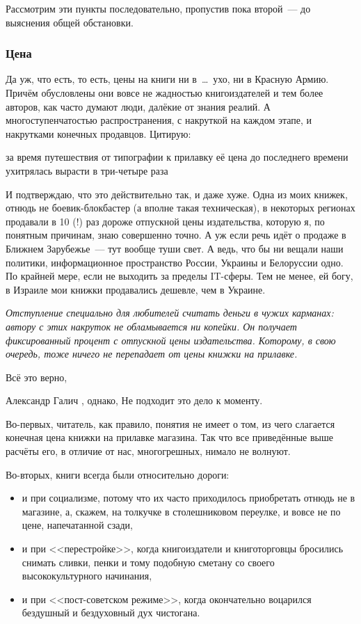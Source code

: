 Рассмотрим эти пункты последовательно, пропустив пока второй~--- до выяснения общей обстановки.
\subsubsection{Цена}
Да уж, что есть, то есть, цены на книги ни в~\dots~ухо, ни в Красную Армию. Причём обусловлены они вовсе не жадностью книгоиздателей и тем более авторов, как часто думают люди, далёкие от знания реалий. А многоступенчатостью распространения, с накруткой на каждом этапе, и накрутками конечных продавцов. Цитирую:


\begin{shadequote}{}
за время путешествия от типографии к прилавку её цена до последнего времени ухитрялась вырасти в три-четыре раза
\end{shadequote}

И подтверждаю, что это действительно так, и даже хуже. Одна из моих книжек, отнюдь не боевик-блокбастер (а вполне такая техническая), в некоторых регионах продавали в 10 (!) раз дороже отпускной цены издательства, которую я, по понятным причинам, знаю совершенно точно. А уж если речь идёт о продаже в Ближнем Зарубежье~--- тут вообще туши свет. А ведь, что бы ни вещали наши политики, информационное пространство России, Украины и Белоруссии одно. По крайней мере, если не выходить за пределы IT-сферы. Тем не менее, ей богу, в Израиле мои книжки продавались дешевле, чем в Украине.


\textit{Отступление специально для любителей считать деньги в чужих карманах: автору с этих накруток не обламывается ни копейки. Он получает фиксированный процент с отпускной цены издательства. Которому, в свою очередь, тоже ничего не перепадает от цены книжки на прилавке.}


Всё это верно,

\begin{shadequote}[r]{Александр Галич}
, однако, Не подходит это дело к моменту. 
\end{shadequote}

Во-первых, читатель, как правило, понятия не имеет о том, из чего слагается конечная цена книжки на прилавке магазина. Так что все приведённые выше расчёты его, в отличие от нас, многогрешных, нимало не волнуют.

Во-вторых, книги всегда были относительно дороги:

\begin{itemize}
	\item и при социализме, потому что их часто приходилось приобретать отнюдь не в магазине, а, скажем, на толкучке в столешниковом переулке, и вовсе не по цене, напечатанной сзади, 
	\item и при <<перестройке>>, когда книгоиздатели и книготорговцы бросились снимать сливки, пенки и тому подобную сметану со своего высококультурного начинания, 
	\item и при <<пост-советском режиме>>, когда окончательно воцарился бездушный и бездуховный дух чистогана. 
\end{itemize}


